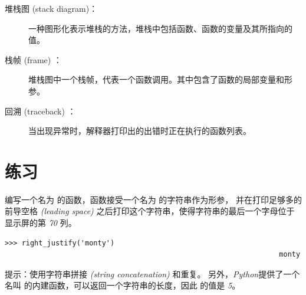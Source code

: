 \begin{description}

\item[堆栈图 (stack diagram)：] 一种图形化表示堆栈的方法，堆栈中包括函数、函数的变量及其所指向的值。
  


\item[栈帧 (frame) ：] 堆栈图中一个栈帧，代表一个函数调用。其中包含了函数的局部变量和形参。
  
  


\item[回溯 (traceback) ：] 当出现异常时，解释器打印出的出错时正在执行的函数列表。
  

\end{description}


%
\section{练习}

\begin{exercise}
  


编写一个名为 {\em {}} 的函数，函数接受一个名为 {\em {}}的字符串作为形参， 并在打印足够多的前导空格 {\em (leading space)} 之后打印这个字符串，使得字符串的最后一个字母位于显示屏的第 {\em 70} 列。

\begin{em}
\begin{lstlisting}
>>> right_justify('monty')
                                                                 monty
\end{lstlisting}
\end{em}


提示：使用字符串拼接 {\em (string concatenation)} 和重复。 另外，{\em Python}提供了一个名叫 {\em {}} 的内建函数，可以返回一个字符串的长度，因此 {\em {}} 的值是 {\em 5}。

\end{exercise}


